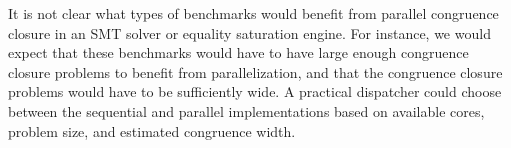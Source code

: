 It is not clear what types
of benchmarks would benefit from parallel congruence closure in an SMT solver or equality saturation engine. For instance, we would
expect that these benchmarks would have to have large enough congruence closure
problems to benefit from parallelization, and that the congruence closure problems would have to be sufficiently wide.
A practical dispatcher could choose between the sequential and parallel implementations based on available cores,
problem size, and estimated congruence width.





